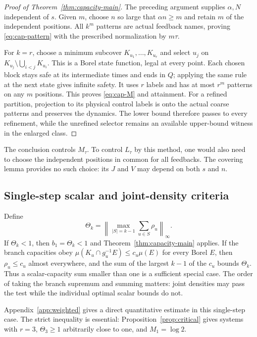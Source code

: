 \documentclass[11pt,reqno]{amsart}
\numberwithin{equation}{section}
\theoremstyle{definition}
\theoremstyle{definition}
\begin{document}
\begin{proof}[Proof of Theorem~\ref{thm:capacity-main}]
The preceding argument supplies $\alpha,N$ independent of $s$.
Given $m$, choose $n$ so large that $\alpha n\ge m$ and retain
$m$ of the independent positions. All $k^m$ patterns are actual
feedback names, proving \eqref{eq:cap-pattern} with the prescribed
normalization by $m\tau$.

For $k=r$, choose a minimum subcover $K_{u_1},\ldots,K_{u_r}$ and
select $u_j$ on $K_{u_j}\setminus\bigcup_{i<j}K_{u_i}$. This is a
Borel state function, legal at every point. Each chosen block stays
safe at its intermediate times and ends in $Q$; applying the same
rule at the next state gives infinite safety. It uses $r$ labels and
has at most $r^m$ patterns on any $m$ positions. This proves
\eqref{eq:cap-M} and attainment. For a refined partition, projection
to its physical control labels is onto the actual coarse patterns
and preserves the dynamics. The lower bound therefore passes to
every refinement, while the unrefined selector remains an available
upper-bound witness in the enlarged class.
\end{proof}

The conclusion controls $M_\tau$. To control $L_\tau$ by this
method, one would also need to choose the independent positions in
common for all feedbacks. The covering lemma provides no such choice:
its $J$ and $V$ may depend on both $s$ and $n$.

\subsection{Single-step scalar and joint-density criteria}
Define
\begin{equation}\label{eq:cap-Theta}
 \Theta_k=\left\|\max_{|S|=k-1}\sum_{u\in S}\rho_u\right\|_\infty.
\end{equation}
If $\Theta_k<1$, then $b_1=\Theta_k<1$ and
Theorem~\ref{thm:capacity-main} applies. If the branch capacities obey
$\mu(K_u\cap g_u^{-1}E)\le c_u\mu(E)$ for every Borel $E$,
then $\rho_u\le c_u$ almost everywhere, and the sum of the largest
$k-1$ of the $c_u$ bounds $\Theta_k$. Thus a scalar-capacity sum
smaller than one is a sufficient special case. The order of taking
the branch supremum and summing matters: joint densities may pass
the test while the individual optimal scalar bounds do not.

Appendix~\ref{app:weighted} gives a direct quantitative estimate in
this single-step case. The strict inequality is essential:
Proposition~\ref{prop:critical} gives systems with $r=3$,
$\Theta_3\ge1$ arbitrarily close to one, and $M_1=\log2$.
\end{document}
